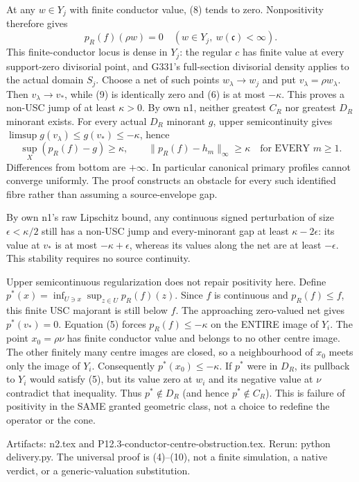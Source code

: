 At any $w\in Y_j$ with finite conductor value, (8) tends to zero.
Nonpositivity therefore gives
\[
             p_R(f)(\rho w)=0
             \quad(w\in Y_j,\ w(\mathfrak c)<\infty).    \tag{9}
\]
This finite-conductor locus is dense in $Y_j$: the regular $c$ has finite
value at every support-zero divisorial point, and G331's full-section
divisorial density applies to the actual domain $S_j$. Choose a net of
such points $w_\lambda\to w_j$ and put $v_\lambda=\rho w_\lambda$.
Then $v_\lambda\to v_*$, while (9) is identically zero and (6) is at
most $-\kappa$. This proves a non-USC jump of at least $\kappa>0$.
By own n1, neither greatest $C_R$ nor greatest $D_R$ minorant exists.
For every actual $D_R$ minorant $g$, upper semicontinuity gives
$\limsup g(v_\lambda)\le g(v_*)\le-\kappa$, hence
\[
  \sup_X(p_R(f)-g)\ge\kappa,\qquad
  \|p_R(f)-h_m\|_\infty\ge\kappa\quad\text{for EVERY }m\ge1. \tag{10}
\]
Differences from bottom are $+\infty$. In particular canonical primary
profiles cannot converge uniformly. The proof constructs an obstacle for
every such identified fibre rather than assuming a source-envelope gap.

By own n1's raw Lipschitz bound, any continuous signed perturbation of
size $\epsilon<\kappa/2$ still has a non-USC jump and every-minorant gap
at least $\kappa-2\epsilon$: its value at $v_*$ is at most
$-\kappa+\epsilon$, whereas its values along the net are at least
$-\epsilon$. This stability requires no source continuity.

Upper semicontinuous regularization does not repair positivity here.
Define $p^*(x)=\inf_{U\ni x}\sup_{z\in U}p_R(f)(z)$. Since $f$ is
continuous and $p_R(f)\le f$, this finite USC majorant is still below
$f$. The approaching zero-valued net gives $p^*(v_*)=0$.
Equation (5) forces $p_R(f)\le-\kappa$ on the ENTIRE image of $Y_i$.
The point $x_0=\rho\nu$ has finite conductor value and belongs to no
other centre image. The other finitely many centre images are closed, so
a neighbourhood of $x_0$ meets only the image of $Y_i$. Consequently
$p^*(x_0)\le-\kappa$. If $p^*$ were in $D_R$, its pullback to $Y_i$
would satisfy (5), but its value zero at $w_i$ and its negative value
at $\nu$ contradict that inequality. Thus $p^*\notin D_R$ (and hence
$p^*\notin C_R$). This is failure of positivity in the SAME granted
geometric class, not a choice to redefine the operator or the cone.

Artifacts: n2.tex and P12.3-conductor-centre-obstruction.tex. Rerun:
python delivery.py. The universal proof is (4)--(10), not a finite
simulation, a native verdict, or a generic-valuation substitution.
